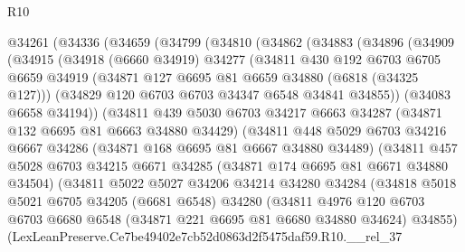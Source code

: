 \begin{lexlean}{R10}
\begin{coremodule}
  @34261
    (@34336
      (@34659
        (@34799
          (@34810
            (@34862
              (@34883
                (@34896
                  (@34909
                    (@34915
                      (@34918
                        (@6660 @34919)
                        @34277
                        (@34811
                          @430
                          @192
                          @6703
                          @6705
                          @6659
                          @34919
                          (@34871 @127 @6695 @81 @6659 @34880 (@6818 (@34325 @127)))
                          (@34829 @120 @6703 @6703 @34347 @6548 @34841 @34855))
                        (@34083 @6658 @34194))
                      (@34811
                        @439
                        @5030
                        @6703
                        @34217
                        @6663
                        @34287
                        (@34871 @132 @6695 @81 @6663 @34880 @34429)
                        (@34811
                          @448
                          @5029
                          @6703
                          @34216
                          @6667
                          @34286
                          (@34871 @168 @6695 @81 @6667 @34880 @34489)
                          (@34811
                            @457
                            @5028
                            @6703
                            @34215
                            @6671
                            @34285
                            (@34871 @174 @6695 @81 @6671 @34880 @34504)
                            (@34811
                              @5022
                              @5027
                              @34206
                              @34214
                              @34280
                              @34284
                              (@34818
                                @5018
                                @5021
                                @6705
                                @34205
                                (@6681 @6548)
                                @34280
                                (@34811
                                  @4976
                                  @120
                                  @6703
                                  @6703
                                  @6680
                                  @6548
                                  (@34871 @221 @6695 @81 @6680 @34880 @34624)
                                  @34855)
                                (LexLeanPreserve.Ce7be49402e7cb52d0863d2f5475daf59.R10.__rel_37

\end{coremodule}
\end{lexlean}
